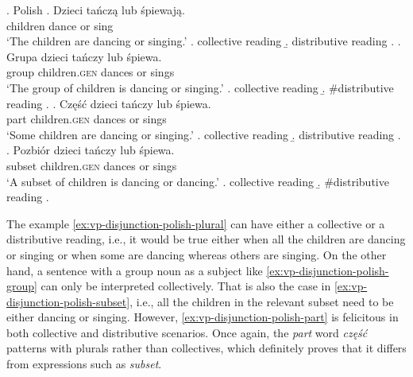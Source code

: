 	\ex.\label{ex:vp-disjunction-polish} Polish
    \ag. Dzieci tańczą lub śpiewają.\label{ex:vp-disjunction-polish-plural}\\
	children dance or sing\\
	`The children are dancing or singing.'
	\a. collective reading
	\b. distributive reading
	\z.
	\bg. Grupa dzieci tańczy lub śpiewa.\label{ex:vp-disjunction-polish-group}\\
	group children\textsc{.gen} dances or sings\\
	`The group of children is dancing or singing.'
	\a. collective reading
	\b. \#distributive reading
	\z.
	\bg. Część dzieci tańczy lub śpiewa.\label{ex:vp-disjunction-polish-part}\\
	part children\textsc{.gen} dances or sings\\
	`Some children are dancing or singing.'
	\a. collective reading
	\b. distributive reading
    \z.
   \pagebreak\bg. Pozbiór dzieci tańczy lub śpiewa.\label{ex:vp-disjunction-polish-subset}\\
   subset children\textsc{.gen} dances or sings\\
   `A subset of children is dancing or dancing.'
   	\a. collective reading
	\b. \#distributive reading
    \z.

The example \ref{ex:vp-disjunction-polish-plural} can have either a collective or a distributive reading, i.e., it would be true either when all the children are dancing or singing or when some are dancing whereas others are singing. On the other hand, a sentence with a group noun as a subject like \ref{ex:vp-disjunction-polish-group} can only be interpreted collectively. That is also the case in \ref{ex:vp-disjunction-polish-subset}, i.e., all the children in the relevant subset need to be either dancing or singing. However, \ref{ex:vp-disjunction-polish-part} is felicitous in both collective and distributive scenarios. Once again, the \textit{part} word \textit{część} patterns with plurals rather than collectives, which definitely proves that it differs from expressions such as \textit{subset}.


